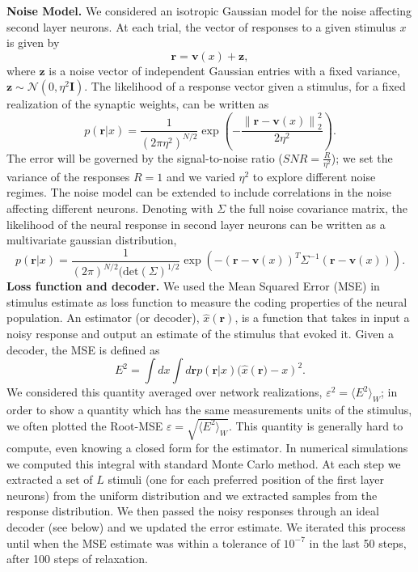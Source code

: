 \documentclass[a4paper]{article}%
\begin{document}
\textbf{Noise Model.} We considered an isotropic Gaussian model for the noise
affecting second layer neurons. At each trial, the vector of responses to a
given stimulus $x$ is given by
\begin{equation}
\mathbf{r} = \mathbf{v}(x) + \mathbf{z },
\label{Eq:r}
\end{equation}
where $\mathbf{z}$ is a noise vector of independent Gaussian entries with a
fixed variance, $\mathbf{z} \sim\mathcal{N}(0,\eta^{2}\mathbf{I})$. The
likelihood of a response vector given a stimulus, for a fixed realization of
the synaptic weights, can be written as
\begin{equation}
p\left(\mathbf{r}|x\right) = \frac{1}{\left(2\pi\eta^{2}\right)^{N/2}} \exp\left(- \frac{\left\|
\mathbf{r}-\mathbf{v}(x)\right\| _{2}^{2}}{2\eta^{2}} \right).\label{Eq:L}
\end{equation}
The error will be governed by the signal-to-noise ratio ($SNR= \frac{R}
{\eta^{2}}$); we set the variance of the responses $R=1$ and we varied
$\eta^{2}$ to explore different noise regimes. The noise model can be extended
to include correlations in the noise affecting different neurons. Denoting
with $\Sigma$ the full noise covariance matrix, the likelihood of the neural
response in second layer neurons can be written as a multivariate gaussian
distribution,
\begin{equation}
p\left(\mathbf{r}|x\right) = \frac{1}{\left(2\pi\right)^{N/2}(\text{det}\left(\Sigma\right)^{1/2}}
\exp\left(-\left(\mathbf{r} - \mathbf{v}(x)\right)^{T}\Sigma^{-1}\left(\mathbf{r} -
\mathbf{v}(x)\right) \right).
\label{Eq:LIn}
\end{equation}
\newline\newline
\textbf{Loss function and decoder.} We used the Mean Squared
Error (MSE) in stimulus estimate as loss function to measure the coding
properties of the neural population. An estimator (or decoder), $\hat
{x}(\mathbf{r})$, is a function that takes in input a noisy response and
output an estimate of the stimulus that evoked it. Given a decoder, the MSE is
defined as
\begin{equation}
E^{2} = \int dx \int d\mathbf{r} p(\mathbf{r}|x) (\hat{x}
\left(\mathbf{r}) -x\right)^{2}.
\label{Eq:MSE}
\end{equation}
We considered this quantity averaged over network realizations, $ \varepsilon^2 = \langle
E^{2}\rangle_{W}$; in order to show a quantity which has the same
measurements units of the stimulus, we often plotted the Root-MSE
$\varepsilon= \sqrt{\langle E^{2}\rangle_{W}}$. This quantity is
generally hard to compute, even knowing a closed form for the estimator. In
numerical simulations we computed this integral with standard Monte Carlo
method. At each step we extracted a set of $L$ stimuli (one for each preferred
position of the first layer neurons) from the uniform distribution and we
extracted samples from the response distribution. We then passed the noisy responses through an
ideal decoder (see below) and we updated the error estimate. We iterated this
process until when the MSE estimate was within a tolerance of $10^{-7}$ in the
last 50 steps, after 100 steps of relaxation.
\end{document}

